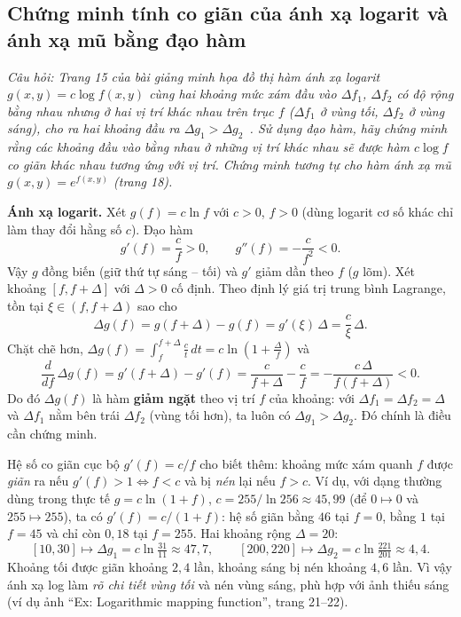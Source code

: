 \subsection{Chứng minh tính co giãn của ánh xạ logarit và ánh xạ mũ bằng đạo hàm}
\label{subsec:w5_log_exp_proof}

\textit{Câu hỏi: Trang 15 của bài giảng minh họa đồ thị hàm ánh xạ logarit $g(x, y) = c \log f(x, y)$ cùng hai khoảng mức xám đầu vào $\Delta f_1$, $\Delta f_2$ có độ rộng bằng nhau nhưng ở hai vị trí khác nhau trên trục $f$ ($\Delta f_1$ ở vùng tối, $\Delta f_2$ ở vùng sáng), cho ra hai khoảng đầu ra $\Delta g_1 > \Delta g_2$~\citep{xlav_lec3}. Sử dụng đạo hàm, hãy chứng minh rằng các khoảng đầu vào bằng nhau ở những vị trí khác nhau sẽ được hàm $c \log f$ co giãn khác nhau tương ứng với vị trí. Chứng minh tương tự cho hàm ánh xạ mũ $g(x, y) = e^{f(x, y)}$ (trang 18).}

\textbf{Ánh xạ logarit.} Xét $g(f) = c \ln f$ với $c > 0$, $f > 0$ (dùng logarit cơ số khác chỉ làm thay đổi hằng số $c$). Đạo hàm
\begin{equation}
g'(f) = \frac{c}{f} > 0, \qquad g''(f) = -\frac{c}{f^2} < 0.
\end{equation}
Vậy $g$ đồng biến (giữ thứ tự sáng -- tối) và $g'$ giảm dần theo $f$ ($g$ lõm). Xét khoảng $[f, f + \Delta]$ với $\Delta > 0$ cố định. Theo định lý giá trị trung bình Lagrange, tồn tại $\xi \in (f, f + \Delta)$ sao cho
\begin{equation}
\Delta g(f) = g(f + \Delta) - g(f) = g'(\xi)\,\Delta = \frac{c}{\xi}\,\Delta.
\end{equation}
Chặt chẽ hơn, $\Delta g(f) = \int_f^{f + \Delta} \frac{c}{t}\,dt = c \ln\!\left(1 + \frac{\Delta}{f}\right)$ và
\begin{equation}
\frac{d}{df}\,\Delta g(f) = g'(f + \Delta) - g'(f) = \frac{c}{f + \Delta} - \frac{c}{f} = -\frac{c\,\Delta}{f(f + \Delta)} < 0.
\end{equation}
Do đó $\Delta g(f)$ là hàm \textbf{giảm ngặt} theo vị trí $f$ của khoảng: với $\Delta f_1 = \Delta f_2 = \Delta$ và $\Delta f_1$ nằm bên trái $\Delta f_2$ (vùng tối hơn), ta luôn có $\Delta g_1 > \Delta g_2$. Đó chính là điều cần chứng minh.

Hệ số co giãn cục bộ $g'(f) = c/f$ cho biết thêm: khoảng mức xám quanh $f$ được \emph{giãn} ra nếu $g'(f) > 1 \Leftrightarrow f < c$ và bị \emph{nén} lại nếu $f > c$. Ví dụ, với dạng thường dùng trong thực tế $g = c \ln(1 + f)$, $c = 255/\ln 256 \approx 45{,}99$ (để $0 \mapsto 0$ và $255 \mapsto 255$), ta có $g'(f) = c/(1 + f)$: hệ số giãn bằng $46$ tại $f = 0$, bằng $1$ tại $f = 45$ và chỉ còn $0{,}18$ tại $f = 255$. Hai khoảng rộng $\Delta = 20$:
\[
[10, 30] \mapsto \Delta g_1 = c \ln\tfrac{31}{11} \approx 47{,}7, \qquad [200, 220] \mapsto \Delta g_2 = c \ln\tfrac{221}{201} \approx 4{,}4.
\]
Khoảng tối được giãn khoảng $2{,}4$ lần, khoảng sáng bị nén khoảng $4{,}6$ lần. Vì vậy ánh xạ log làm \emph{rõ chi tiết vùng tối} và nén vùng sáng, phù hợp với ảnh thiếu sáng (ví dụ ảnh ``Ex: Logarithmic mapping function'', trang 21--22).

